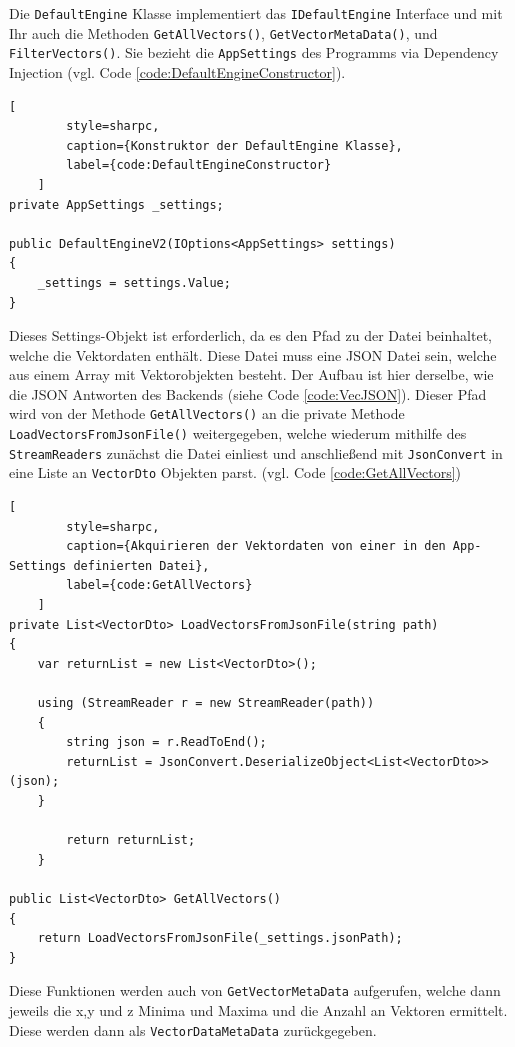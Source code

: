Die \texttt{DefaultEngine} Klasse implementiert das \texttt{IDefaultEngine} Interface
und mit Ihr auch die Methoden \texttt{GetAllVectors()}, \texttt{GetVectorMetaData()},
und \texttt{FilterVectors()}. Sie bezieht die \texttt{AppSettings} des Programms via
Dependency Injection (vgl. Code \ref{code:DefaultEngineConstructor}).

\begin{codeblock}
	\begin{lstlisting}[
		style=sharpc,
		caption={Konstruktor der DefaultEngine Klasse},
		label={code:DefaultEngineConstructor}
	]
private AppSettings _settings;

public DefaultEngineV2(IOptions<AppSettings> settings)
{
	_settings = settings.Value;
}
	\end{lstlisting}
\end{codeblock}

Dieses Settings-Objekt ist erforderlich, da es den Pfad zu der Datei
beinhaltet, welche die Vektordaten enthält. Diese Datei muss eine JSON
Datei sein, welche aus einem Array mit Vektorobjekten besteht.
Der Aufbau ist hier derselbe, wie die JSON Antworten des Backends
(siehe Code \ref{code:VecJSON}). Dieser Pfad wird von der Methode
\texttt{GetAllVectors()} an die private Methode
\texttt{LoadVectorsFromJsonFile()} weitergegeben, welche wiederum
mithilfe des \texttt{StreamReaders} zunächst die Datei einliest
und anschließend mit \texttt{JsonConvert} in eine Liste an
\texttt{VectorDto} Objekten parst. (vgl. Code \ref{code:GetAllVectors})

\begin{codeblock}
	\begin{lstlisting}[
		style=sharpc,
		caption={Akquirieren der Vektordaten von einer in den App-Settings definierten Datei},
		label={code:GetAllVectors}
	]
private List<VectorDto> LoadVectorsFromJsonFile(string path)
{
	var returnList = new List<VectorDto>();

	using (StreamReader r = new StreamReader(path))
	{
		string json = r.ReadToEnd();
		returnList = JsonConvert.DeserializeObject<List<VectorDto>>(json);
	}

		return returnList;
	}

public List<VectorDto> GetAllVectors()
{
	return LoadVectorsFromJsonFile(_settings.jsonPath);
}
	\end{lstlisting}
\end{codeblock}

Diese Funktionen werden auch von \texttt{GetVectorMetaData}
aufgerufen, welche dann jeweils die x,y und z Minima und Maxima und
die Anzahl an Vektoren ermittelt. Diese werden dann als
\texttt{VectorDataMetaData} zurückgegeben.

